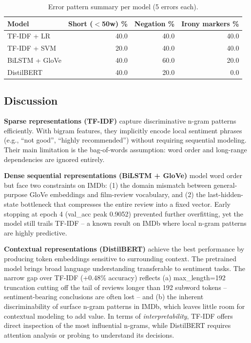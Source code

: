 \documentclass[11pt,a4paper]{article}
\begin{document}
\begin{table}[H]
\centering
\caption{Error pattern summary per model (5 errors each).}
\label{tab:q1errors}
\begin{tabular}{lrrr}
\toprule
Model & Short ($<$50w) \% & Negation \% & Irony markers \% \\
\midrule
TF-IDF + LR    & 40.0 & 40.0 & 40.0 \\
TF-IDF + SVM   & 20.0 & 40.0 & 40.0 \\
BiLSTM + GloVe & 40.0 & 60.0 & 20.0 \\
DistilBERT     & 40.0 & 20.0 &  0.0 \\
\bottomrule
\end{tabular}
\end{table}

\subsection{Discussion}

\textbf{Sparse representations (TF-IDF)} capture discriminative n-gram patterns efficiently. With bigram features, they implicitly encode local sentiment phrases (e.g., ``not good'', ``highly recommended'') without requiring sequential modeling. Their main limitation is the bag-of-words assumption: word order and long-range dependencies are ignored entirely.

\textbf{Dense sequential representations (BiLSTM + GloVe)} model word order but face two constraints on IMDb: (1) the domain mismatch between general-purpose GloVe embeddings and film-review vocabulary, and (2) the last-hidden-state bottleneck that compresses the entire review into a fixed vector. Early stopping at epoch 4 (val\_acc peak 0.9052) prevented further overfitting, yet the model still trails TF-IDF -- a known result on IMDb where local n-gram patterns are highly predictive.

\textbf{Contextual representations (DistilBERT)} achieve the best performance by producing token embeddings sensitive to surrounding context. The pretrained model brings broad language understanding transferable to sentiment tasks. The narrow gap over TF-IDF (+0.48\% accuracy) reflects (a) max\_length=192 truncation cutting off the tail of reviews longer than 192 subword tokens -- sentiment-bearing conclusions are often lost -- and (b) the inherent discriminability of surface n-gram patterns in IMDb, which leaves little room for contextual modeling to add value. In terms of \textit{interpretability}, TF-IDF offers direct inspection of the most influential n-grams, while DistilBERT requires attention analysis or probing to understand its decisions.
\end{document}
